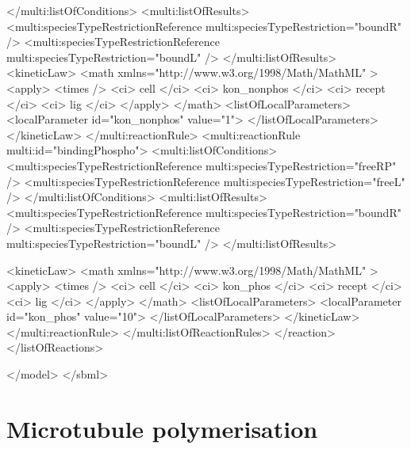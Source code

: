 \begin{example}
            </multi:listOfConditions>
            <multi:listOfResults>
              <multi:speciesTypeRestrictionReference multi:speciesTypeRestriction="boundR" />
              <multi:speciesTypeRestrictionReference multi:speciesTypeRestriction="boundL" />
            </multi:listOfResults>
            <kineticLaw>
              <math xmlns="http://www.w3.org/1998/Math/MathML" >
                <apply>
                  <times />
                  <ci> cell </ci>
                  <ci> kon_nonphos </ci>
                  <ci> recept </ci>
                  <ci> lig </ci>
                </apply>
              </math>
              <listOfLocalParameters>
                <localParameter id="kon_nonphos" value="1">
              </listOfLocalParameters>
            </kineticLaw>
          </multi:reactionRule>
          <multi:reactionRule multi:id="bindingPhospho">
            <multi:listOfConditions>
              <multi:speciesTypeRestrictionReference multi:speciesTypeRestriction="freeRP" />
              <multi:speciesTypeRestrictionReference multi:speciesTypeRestriction="freeL" />
            </multi:listOfConditions>
            <multi:listOfResults>
              <multi:speciesTypeRestrictionReference multi:speciesTypeRestriction="boundR" />
              <multi:speciesTypeRestrictionReference multi:speciesTypeRestriction="boundL" />
            </multi:listOfResults>

            <kineticLaw>
              <math xmlns="http://www.w3.org/1998/Math/MathML" >
                <apply>
                  <times />
                  <ci> cell </ci>
                  <ci> kon_phos </ci>
                  <ci> recept </ci>
                  <ci> lig </ci>
                </apply>
              </math>
              <listOfLocalParameters>
                <localParameter id="kon_phos" value="10">
              </listOfLocalParameters>
            </kineticLaw>
          </multi:reactionRule>
        </multi:listOfReactionRules>
      </reaction>
    </listOfReactions>

  </model>
</sbml>
\end{example}

\section{Microtubule polymerisation}


